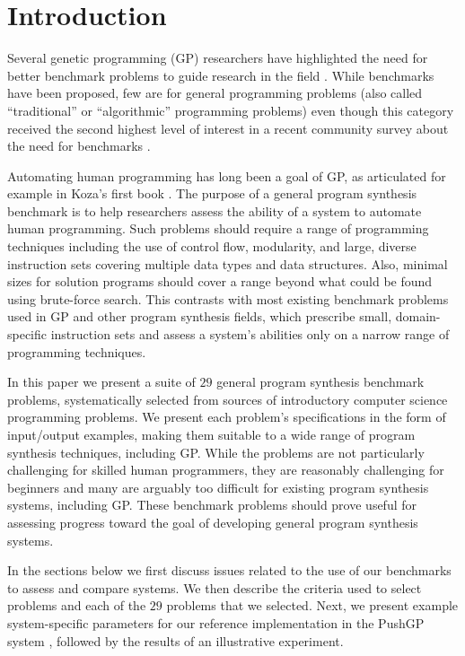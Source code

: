 \documentclass{sig-alternate}
\begin{document}


\section{Introduction}

Several genetic programming (GP) researchers have highlighted the need for better benchmark problems to guide research in the field \cite{McDermott:2012:GECCO, White:2013:BGB:2441218.2441242, Woodward:2014:GECCOcomp}. While benchmarks have been proposed, few are for general programming problems (also called ``traditional'' or ``algorithmic'' programming problems) even though this category received the second highest level of interest in a recent community survey about the need for benchmarks \cite{White:2013:BGB:2441218.2441242}. 

Automating human programming has long been a goal of GP, as articulated for example in Koza's first book \cite{koza:book}. The purpose of a general program synthesis benchmark is to help researchers assess the ability of a system to automate human programming. Such problems should require a range of programming techniques including the use of control flow, modularity, and large, diverse instruction sets covering multiple data types and data structures. Also, minimal sizes for solution programs should cover a range beyond what could be found using brute-force search. This contrasts with most existing benchmark problems used in GP and other program synthesis fields, which prescribe small, domain-specific instruction sets and assess a system's abilities only on a narrow range of programming techniques.

In this paper we present a suite of $29$ general program synthesis benchmark problems, systematically selected from sources of introductory computer science programming problems. We present each problem's specifications in the form of input/output examples, making them suitable to a wide range of program synthesis techniques, including GP. While the problems are not particularly challenging for skilled human programmers, they are reasonably challenging for beginners and many are arguably too difficult for existing program synthesis systems, including GP. These benchmark problems should prove useful for assessing progress toward the goal of developing general program synthesis systems.

In the sections below we first discuss issues related to the use of our benchmarks to assess and compare systems. We then describe the criteria used to select problems and each of the $29$ problems that we selected. Next, we present example system-specific parameters for our reference implementation in the PushGP system \cite{spector:2002:GPEM, 1068292}, followed by the results of an illustrative experiment.
\end{document}
